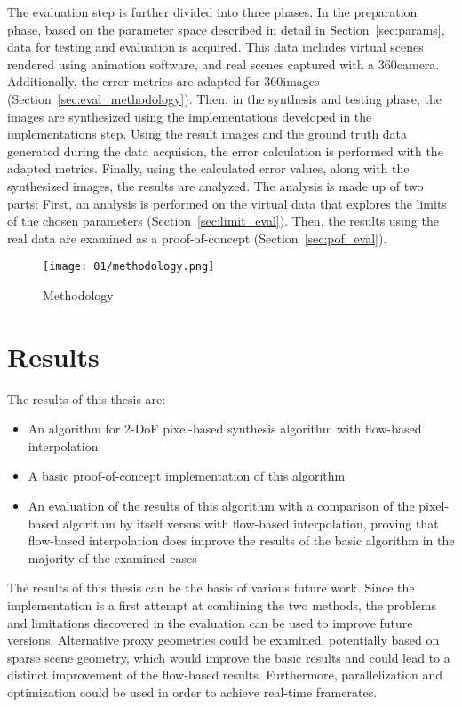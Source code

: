 The evaluation step is further divided into three phases. In the preparation phase, based on the parameter space described in detail in Section~\ref{sec:params}, data for testing and evaluation is acquired. This data includes virtual scenes rendered using animation software, and real scenes captured with a 360\degree camera. Additionally, the error metrics are adapted for 360\degree images (Section~\ref{sec:eval_methodology}).
Then, in the synthesis and testing phase, the images are synthesized using the implementations developed in the implementations step. Using the result images and the ground truth data generated during the data acquision, the error calculation is performed with the adapted metrics.
Finally, using the calculated error values, along with the synthesized images, the results are analyzed. The analysis is made up of two parts: First, an analysis is performed on the virtual data that explores the limits of the chosen parameters (Section~\ref{sec:limit_eval}). Then, the results using the real data are examined as a proof-of-concept (Section~\ref{sec:pof_eval}).

\begin{figure}
		\centering
		\texttt{[image: 01/methodology.png]}
		\caption{Methodology}
		\label{fig:methodology}
\end{figure}

\section*{Results}
The results of this thesis are:
\begin{itemize}
  \item An algorithm for 2-DoF pixel-based synthesis algorithm with flow-based interpolation
  \item A basic proof-of-concept implementation of this algorithm
  \item An evaluation of the results of this algorithm with a comparison of the pixel-based algorithm by itself versus with flow-based interpolation, proving that flow-based interpolation does improve the results of the basic algorithm in the majority of the examined cases
\end{itemize}

The results of this thesis can be the basis of various future work. Since the implementation is a first attempt at combining the two methods, the problems and limitations discovered in the evaluation can be used to improve future versions. Alternative proxy geometries could be examined, potentially based on sparse scene geometry, which would improve the basic results and could lead to a distinct improvement of the flow-based results. Furthermore, parallelization and optimization could be used in order to achieve real-time framerates. 

